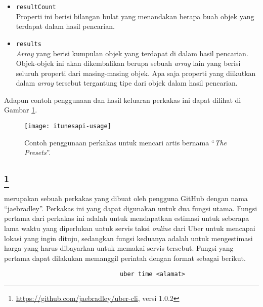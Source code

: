 \begin{itemize}
	\item \verb|resultCount|\\
	Properti ini berisi bilangan bulat yang menandakan berapa buah objek yang terdapat dalam hasil pencarian.
	\item \verb|results|\\
	\textit{Array} yang berisi kumpulan objek yang terdapat di dalam hasil pencarian. Objek-objek ini akan dikembalikan berupa sebuah \textit{array} lain yang berisi seluruh properti dari masing-masing objek. Apa saja properti yang diikutkan dalam \textit{array} tersebut tergantung tipe dari objek dalam hasil pencarian.
\end{itemize}
\vspace{0.75\baselineskip} %
\noindent
Adapun contoh penggunaan dan hasil keluaran perkakas ini dapat dilihat di Gambar \ref{fig:similarapps-itunesapi-usage}.

\begin{figure}[ht]
    \centering
    \texttt{[image: itunesapi-usage]}
    \caption[Contoh penggunaan perkakas \itunesapi]{Contoh penggunaan perkakas \itunesapi\xspace untuk mencari artis bernama ``\textit{The Presets}''.}
    \label{fig:similarapps-itunesapi-usage}
\end{figure}

\subsection[\ubercli]{\ubercli\footnote{\href{https://github.com/jaebradley/uber-cli}{https://github.com/jaebradley/uber-cli}, versi 1.0.2}}
\label{sec:similarapps-ubercli}

\ubercli\xspace merupakan sebuah perkakas \cl\xspace yang dibuat oleh pengguna GitHub dengan nama ``jaebradley''. Perkakas ini yang dapat digunakan untuk dua fungsi utama. Fungsi pertama dari perkakas ini adalah untuk mendapatkan estimasi untuk seberapa lama waktu yang diperlukan untuk servis taksi \textit{online} dari Uber untuk mencapai lokasi yang ingin dituju, sedangkan fungsi \mbox{keduanya} adalah untuk mengestimasi harga yang harus dibayarkan untuk memakai servis tersebut. 
\newpage
\noindent
Fungsi yang pertama dapat dilakukan memanggil perintah dengan format sebagai berikut.

\begin{verbatim}
                                uber time <alamat>
\end{verbatim}

